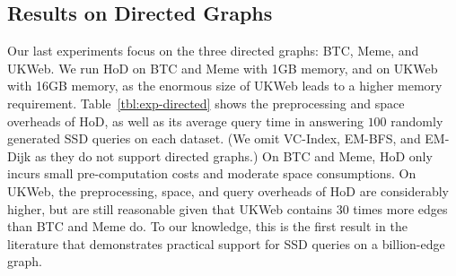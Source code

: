 \documentclass{sig-alternate}
\def\figcapup{\vspace{-2mm}}
\def\figcapdown{\vspace{-3mm}}
\begin{document}
\begin{sloppy}


\subsection{Results on Directed Graphs} \label{sec:exp-directed}

Our last experiments focus on the three directed graphs: BTC, Meme, and UKWeb. We run HoD on BTC and Meme with 1GB memory, and on UKWeb with 16GB memory, as the enormous size of UKWeb leads to a higher memory requirement. Table~\ref{tbl:exp-directed} shows the preprocessing and space overheads of HoD, as well as its average query time in answering $100$ randomly generated SSD queries on each dataset. (We omit VC-Index, EM-BFS, and EM-Dijk as they do not support directed graphs.) On BTC and Meme, HoD only incurs small pre-computation costs and moderate space consumptions. On UKWeb, the preprocessing, space, and query overheads of HoD are considerably higher, but are still reasonable given that UKWeb contains $30$ times more edges than BTC and Meme do. To our knowledge, this is the first result in the literature that demonstrates practical support for SSD queries on a billion-edge graph. %





\end{sloppy}
\end{document}
